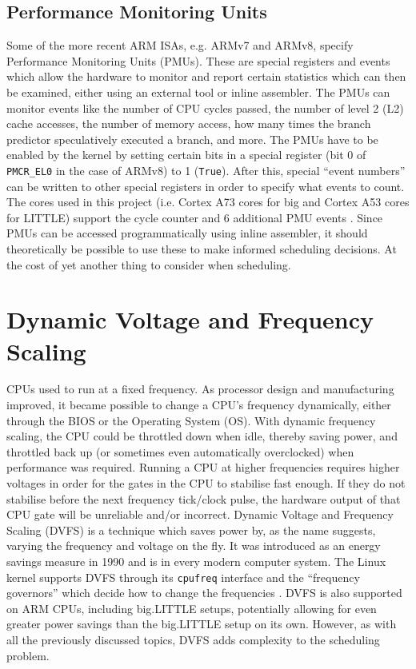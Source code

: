     \subsection{Performance Monitoring Units}
    Some of the more recent ARM ISAs, e.g. ARMv7 and ARMv8, specify Performance
    Monitoring Units (PMUs). These are special registers and events which allow
    the hardware to monitor and report certain statistics which can then be
    examined, either using an external tool or inline assembler. The PMUs can
    monitor events like the number of CPU cycles passed, the number of level 2
    (L2) cache accesses, the number of memory access, how many times the branch
    predictor speculatively executed a branch, and more. The PMUs have to be
    enabled by the kernel by setting certain bits in a special register (bit 0
    of \texttt{PMCR\_EL0} in the case of ARMv8) to 1 (\texttt{True}). After
    this, special ``event numbers'' can be written to other special registers in
    order to specify what events to count. The cores used in this project (i.e.
    Cortex A73 cores for big and Cortex A53 cores for LITTLE) support the cycle
    counter and 6 additional PMU events
    \cite{noauthor_arm_2015,noauthor_arm_2016}. Since PMUs can be accessed
    programmatically using inline assembler, it should theoretically be possible
    to use these to make informed scheduling decisions. At the cost of yet
    another thing to consider when scheduling.

\section{Dynamic Voltage and Frequency Scaling}
CPUs used to run at a fixed frequency. As processor design and manufacturing
improved, it became possible to change a CPU's frequency dynamically, either
through the BIOS or the Operating System (OS). With dynamic frequency scaling,
the CPU could be throttled down when idle, thereby saving power, and throttled
back up (or sometimes even automatically overclocked) when performance was
required. Running a CPU at higher frequencies requires higher voltages in order
for the gates in the CPU to stabilise fast enough. If they do not stabilise
before the next frequency tick/clock pulse, the hardware output of that CPU gate
will be unreliable and/or incorrect. Dynamic Voltage and Frequency Scaling
(DVFS) is a technique which saves power by, as the name suggests, varying the
frequency and voltage on the fly. It was introduced as an energy savings measure
in 1990 \cite{macken_voltage_1990} and is in every modern computer system. The
Linux kernel supports DVFS through its \texttt{cpufreq} interface and the
``frequency governors'' which decide how to change the frequencies
\cite{wysocki_cpu_nodate}. DVFS is also supported on ARM CPUs, including
big.LITTLE setups, potentially allowing for even greater power savings than the
big.LITTLE setup on its own. However, as with all the previously discussed
topics, DVFS adds complexity to the scheduling problem.
\\

